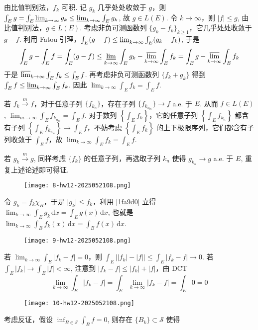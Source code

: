 由比值判别法，$f_k$ 可积. 记 $g_k$ 几乎处处收敛于 $g$，则 $\int_{E}g=\int_{E}\varliminf_{ k \to \infty }g_k\leq \varliminf_{ k \to \infty }\int_{E}g_k$, 故 $g\in L(E)$. 令 $k\to \infty$，则 $\lvert f \rvert\leq g$, 由比值判别法，$g\in L(E)$. 考虑非负可测函数列 $\{ g_k-f_k \}_{k\geq1}$，它几乎处处收敛于 $g-f$. 利用 Fatou 引理，$\int_{E}(g-f)\leq \varliminf_{ k \to \infty }\int_{E}(g_k-f_k)$, 于是
\[
\int_{E}g-\int_{E}f=\int_{E}(g-f)\leq \varliminf_{ k \to \infty } \int_{E}g_k-\varlimsup_{ k \to \infty } \int_{E}f_k=\int_{E}g-\varlimsup_{ k \to \infty } \int_{E}f_k
\]
于是 $\varlimsup_{ k \to \infty }\int_{E}f_k\leq \int_{E}f$. 再考虑非负可测函数列 $\{ f_k+g_k \}$ 得到 $\int_{E}f\leq \varliminf_{ k \to \infty }\int_{E}f_k$. 因此 $\lim_{ k \to \infty }\int _Ef_k=\int_{E}f$.

若 $f_k\overset{ m }{ \to }f$，对于任意子列 $\{ f_{k_{n}} \}$，存在子列 $\{ f_{k_{n_{m}}} \}\to f$ a.e. 于 $E$. 从而 $f\in L(E)$, $\lim_{ m \to \infty }\int_{E}f_{k_{n_m}}=\int_{E}f$. 对于数列 $\left\{  \int_{E}f_{k}  \right\}$，它的任意子列 $\left\{  \int_{E} f_{k_{n}} \right\}$ 都含有子列 $\left\{  \int_{E}f_{k_{n_{m}}}  \right\}\to \int_{E}f$，不妨考虑 $\left\{  \int_{E}f_k  \right\}$ 的上下极限序列，它们都含有子列收敛于 $\int_{E}f$，故 $\lim_{ k \to \infty }\int _Ef_k=\int_{E}f$.

若 $g_k\overset{ m }{ \to }g$, 同样考虑 $\{ f_k \}$ 的任意子列，再选取子列 $k_{n}$ 使得 $g_{k_n}\to g$ a.e. 于 $E$, 重复上述论述即可得证.

\begin{exercise}
\begin{figure}[H]
\centering
\texttt{[image: 8-hw12-2025052108.png]}
\label{}
\end{figure}
\end{exercise}
令 $g_k=f_k\chi_{B}$，于是 $\lvert g_k \rvert\leq f_k$，利用 \cref{1fa9d0} 立得 $\lim_{ k \to \infty }\int_{E}^{} g_k \, \mathrm{d}x=\int_{E}^{} g(x) \, \mathrm{d}x$, 也就是 $\lim_{ k \to \infty }\int_{B}^{} f_k(x) \, \mathrm{d}x=\int_{B}^{} f(x) \, \mathrm{d}x$.

\begin{exercise}
\begin{figure}[H]
\centering
\texttt{[image: 9-hw12-2025052108.png]}
\label{}
\end{figure}
\end{exercise}
若 $\lim_{ k \to \infty }\int _E\lvert f_k-f \rvert=0$，则 $\int_{E}\lvert \lvert f_k \rvert-\lvert f \rvert \rvert\leq \int_{E}\lvert f_k-f \rvert\to0$. 若 $\int_{E}\lvert f_k \rvert\to \int_{E}\lvert f \rvert<\infty$, 注意到 $\lvert f_k-f \rvert\leq \lvert f_k \rvert+\lvert f \rvert$，由 DCT
\[
\lim_{ k \to \infty } \int_{E}\lvert f_k-f \rvert =\int_{E}\lim_{ k \to \infty } \lvert f_k-f \rvert =\int_{E}0=0
\]
\begin{exercise}
\begin{figure}[H]
\centering
\texttt{[image: 10-hw12-2025052108.png]}
\label{}
\end{figure}
\end{exercise}
考虑反证，假设 $\inf_{B\in \mathscr{S}}\int_{B}f=0$, 则存在 $\{ B_k \}\subset \mathscr{S}$ 使得

